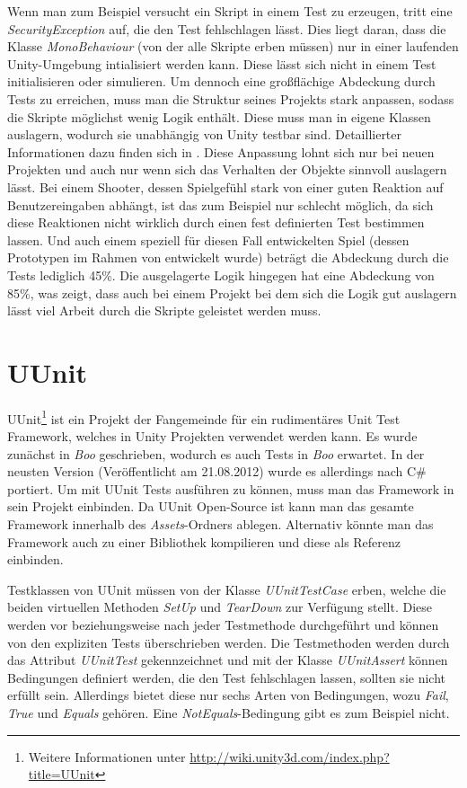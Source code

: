 Wenn man zum Beispiel versucht ein Skript in einem Test zu erzeugen, tritt eine \textit{SecurityException} auf, die den Test fehlschlagen lässt. Dies liegt daran, dass die Klasse \textit{MonoBehaviour} (von der alle Skripte erben müssen) nur in einer laufenden Unity-Umgebung intialisiert werden kann. Diese lässt sich nicht in einem Test initialisieren oder simulieren. Um dennoch eine großflächige Abdeckung durch Tests zu erreichen, muss man die Struktur seines Projekts stark anpassen, sodass die Skripte möglichst wenig Logik enthält. Diese muss man in eigene Klassen auslagern, wodurch sie unabhängig von Unity testbar sind. Detaillierter Informationen dazu finden sich in \cite{TDGD13}. Diese Anpassung lohnt sich nur bei neuen Projekten und auch nur wenn sich das Verhalten der Objekte sinnvoll auslagern lässt. Bei einem Shooter, dessen Spielgefühl stark von einer guten Reaktion auf Benutzereingaben abhängt, ist das zum Beispiel nur schlecht möglich, da sich diese Reaktionen nicht wirklich durch einen fest definierten Test bestimmen lassen. Und auch einem speziell für diesen Fall entwickelten Spiel (dessen Prototypen im Rahmen von \cite{TDGD13} entwickelt wurde) beträgt die Abdeckung durch die Tests lediglich 45\%. Die ausgelagerte Logik hingegen hat eine Abdeckung von 85\%, was zeigt, dass auch bei einem Projekt bei dem sich die Logik gut auslagern lässt viel Arbeit durch die Skripte geleistet werden muss.

\section{UUnit}

UUnit\footnote{Weitere Informationen unter \url{http://wiki.unity3d.com/index.php?title=UUnit}} ist ein Projekt der Fangemeinde für ein rudimentäres Unit Test Framework, welches in Unity Projekten verwendet werden kann. Es wurde zunächst in \textit{Boo} geschrieben, wodurch es auch Tests in \textit{Boo} erwartet. In der neusten Version (Veröffentlicht am 21.08.2012) wurde es allerdings nach C\# portiert.
Um mit UUnit Tests ausführen zu können, muss man das Framework in sein Projekt einbinden. Da UUnit Open-Source ist kann man das gesamte Framework innerhalb des \textit{Assets}-Ordners ablegen. Alternativ könnte man das Framework auch zu einer Bibliothek kompilieren und diese als Referenz einbinden.

Testklassen von UUnit müssen von der Klasse \textit{UUnitTestCase} erben, welche die beiden virtuellen Methoden \textit{SetUp} und \textit{TearDown} zur Verfügung stellt. Diese werden vor beziehungsweise nach jeder Testmethode durchgeführt und können von den expliziten Tests überschrieben werden. Die Testmethoden werden durch das Attribut \textit{UUnitTest} gekennzeichnet und mit der Klasse \textit{UUnitAssert} können Bedingungen definiert werden, die den Test fehlschlagen lassen, sollten sie nicht erfüllt sein. Allerdings bietet diese nur sechs Arten von Bedingungen, wozu \textit{Fail}, \textit{True} und \textit{Equals} gehören. Eine \textit{NotEquals}-Bedingung gibt es zum Beispiel nicht.


